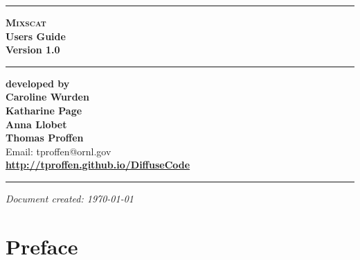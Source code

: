 \documentclass[12pt]{report}
\newcommand{\version}{1.0}
\newcommand{\mixscat}{\textsc {Mixscat}}
\begin{document}

\begin{titlepage}
\begin{flushright}

  \hrule
  \vspace{15mm}
  \textbf{{ \mixscat}} \\
  \vspace{15mm}
  \textbf{{ Users Guide}} \\
  \vspace{10mm}
  \textbf{{\Huge Version  \version}} \\
  \vspace{10mm}

  \hrule
  \vspace{20mm}
  \textbf{developed by} \\

  \vspace{5mm}
  \textbf{\Large Caroline Wurden} \\
  \vspace{2mm}
  \textbf{\Large Katharine Page} \\
  \vspace{2mm}
  \textbf{\Large Anna Llobet} \\

  \vspace{2mm}
  \textbf{\Large Thomas Proffen} \\
  \vspace{5mm}
  Email: tproffen@ornl.gov \\

  \vspace{12mm}
  \textbf{\Large \url{http://tproffen.github.io/DiffuseCode}} \\

  \vspace{3mm}
  \hrule

\end{flushright}
\begin{flushright}
  \textit{Document created: \today}
\end{flushright}
\end{titlepage}


\chapter*{Preface}
\end{document}
